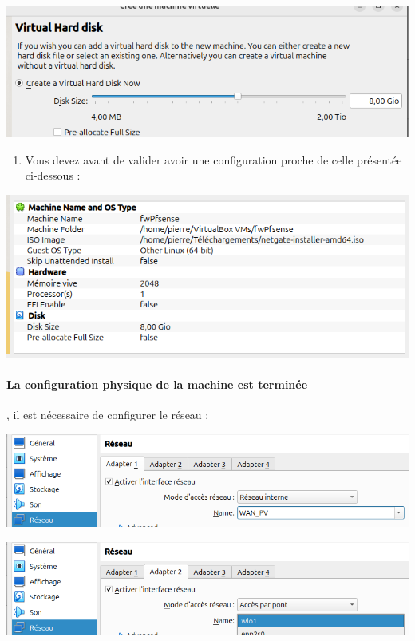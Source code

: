\documentclass[french, 12pt]{article}%
\begin{document}
\begin{center}
\includegraphics[scale=0.5]{./ressource/VM_Create_3.png}
\end{center}

\begin{enumerate}[resume]
\item Vous devez avant de valider avoir une configuration proche de celle présentée ci-dessous : 
\end{enumerate}


\begin{center}
\includegraphics[scale=0.5]{./ressource/VM_Create_4.png}
\end{center}


\paragraph{La configuration physique de la machine est terminée}, il est nécessaire de configurer le réseau : 


\begin{center}
\includegraphics[scale=0.5]{./ressource/VM_network1.png}
\end{center}
\begin{center}
\includegraphics[scale=0.5]{./ressource/VM_network2.png}
\end{center}
\end{document}
